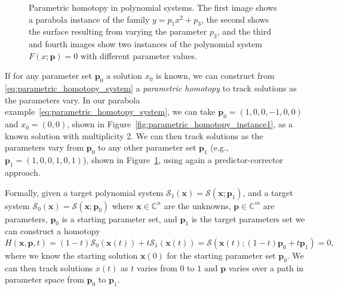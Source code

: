 \begin{figure}[hb]
{
		\label{fig:parametric_homotopy_instance2}
	}
	\caption{Parametric homotopy in polynomial systems. The first image shows a parabola instance of the family $y = p_1 x^2 + p_3$, the second shows the surface resulting from varying the parameter $p_3$, and the third and fourth images show two instances of the polynomial system $F(x; \mathbf{p}) = 0$ with different parameter values.}
\end{figure}

If for any parameter set $\mathbf{p}_0$ a solution $x_0$ is known, we can construct from \ref{eq:parametric_homotopy_system} a \emph{parametric homotopy} to track solutions as the parameters vary. In our parabola example~\ref{eq:parametric_homotopy_system}, we can take \(\mathbf{p}_0 = (1, 0, 0, -1, 0, 0)\) and \(x_0 = (0, 0)\), shown in Figure~\ref{fig:parametric_homotopy_instance1}, as a known solution with multiplicity 2. We can then track solutions as the parameters vary from \(\mathbf{p}_0\) to any other parameter set \(\mathbf{p}_1\) (e.g., \(\mathbf{p}_1 = (1, 0, 0, 1, 0, 1)\)), shown in Figure~\ref{fig:parametric_homotopy_instance2}, using again a predictor-corrector approach.

Formally, given a target polynomial system \(\mathcal{S}_1(\mathbf{x}) = \mathcal{S}(\mathbf{x}; \mathbf{p}_1)\), and a target system \(\mathcal{S}_0(\mathbf{x}) = \mathcal{S}(\mathbf{x}; \mathbf{p}_0)\) where \(\mathbf{x} \in \mathbb{C}^n\) are the unknowns, \(\mathbf{p} \in \mathbb{C}^m\) are parameters, $\mathbf{p}_0$ is a starting parameter set, and $\mathbf{p}_1$ is the target parameters set we can construct a homotopy
\[
H(\mathbf{x}, \mathbf{p}, t) = (1-t)\mathcal{S}_0(\mathbf{x}(t)) + t\mathcal{S}_1(\mathbf{x}(t)) = \mathcal{S}(\mathbf{x}(t); (1-t)\mathbf{p}_0 + t\mathbf{p}_1) = 0,
\]
where we know the starting solution $\mathbf{x}(0)$ for the starting parameter set $\mathbf{p}_0$.
We can then track solutions \(x(t)\) as \(t\) varies from \(0\) to \(1\) and \(\mathbf{p}\) varies over a path in parameter space from $\mathbf{p}_0$ to $\mathbf{p}_1$.

